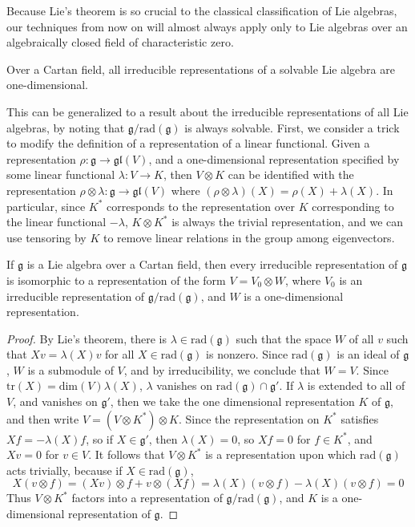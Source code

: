 Because Lie's theorem is so crucial to the classical classification of Lie algebras, our techniques from now on will almost always apply only to Lie algebras over an algebraically closed field of characteristic zero.

\begin{corollary}
    Over a Cartan field, all irreducible representations of a solvable Lie algebra are one-dimensional.
\end{corollary}

This can be generalized to a result about the irreducible representations of all Lie algebras, by noting that $\mathfrak{g}/\text{rad}(\mathfrak{g})$ is always solvable. First, we consider a trick to modify the definition of a representation of a linear functional. Given a representation $\rho: \mathfrak{g} \to \mathfrak{gl}(V)$, and a one-dimensional representation specified by some linear functional $\lambda: V \to K$, then $V \otimes K$ can be identified with the representation $\rho \otimes \lambda: \mathfrak{g} \to \mathfrak{gl}(V)$ where $(\rho \otimes \lambda)(X) = \rho(X) + \lambda(X)$. In particular, since $K^*$ corresponds to the representation over $K$ corresponding to the linear functional $-\lambda$, $K \otimes K^*$ is always the trivial representation, and we can use tensoring by $K$ to remove linear relations in the group among eigenvectors.

\begin{theorem}
    If $\mathfrak{g}$ is a Lie algebra over a Cartan field, then every irreducible representation of $\mathfrak{g}$ is isomorphic to a representation of the form $V = V_0 \otimes W$, where $V_0$ is an irreducible representation of $\mathfrak{g}/\text{rad}(\mathfrak{g})$, and $W$ is a one-dimensional representation.
\end{theorem}
\begin{proof}
    By Lie's theorem, there is $\lambda \in \text{rad}(\mathfrak{g})$ such that the space $W$ of all $v$ such that $Xv = \lambda(X)v$ for all $X \in \text{rad}(\mathfrak{g})$ is nonzero. Since $\text{rad}(\mathfrak{g})$ is an ideal of $\mathfrak{g}$, $W$ is a submodule of $V$, and by irreducibility, we conclude that $W = V$. Since $\text{tr}(X) = \text{dim}(V) \lambda(X)$, $\lambda$ vanishes on $\text{rad}(\mathfrak{g}) \cap \mathfrak{g}'$. If $\lambda$ is extended to all of $V$, and vanishes on $\mathfrak{g}'$, then we take the one dimensional representation $K$ of $\mathfrak{g}$, and then write $V = (V \otimes K^*) \otimes K$. Since the representation on $K^*$ satisfies $Xf = - \lambda(X) f$, so if $X \in \mathfrak{g}'$, then $\lambda(X) = 0$, so $Xf = 0$ for $f \in K^*$, and $Xv = 0$ for $v \in V$. It follows that $V \otimes K^*$ is a representation upon which $\text{rad}(\mathfrak{g})$ acts trivially, because if $X \in \text{rad}(\mathfrak{g})$,
    \[ X(v \otimes f) = (Xv) \otimes f + v \otimes (Xf) = \lambda(X) (v \otimes f) - \lambda(X) (v \otimes f) = 0 \]
    Thus $V \otimes K^*$ factors into a representation of $\mathfrak{g}/\text{rad}(\mathfrak{g})$, and $K$ is a one-dimensional representation of $\mathfrak{g}$.
\end{proof}


